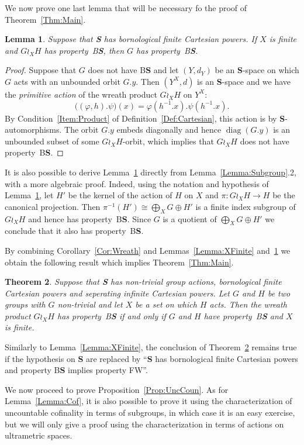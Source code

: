 \documentclass[a4paper]{article}
\newtheorem{lem}{Lemma}[section]
\newtheorem{thm}[lem]{Theorem}
\theoremstyle{definition}
\DeclareMathOperator\diag{diag}
\newcommand*{\category}[1]{\textbf{#1}}
\newcommand*{\CatS}{\category{S}}
\newcommand*{\BS}{B\textbf{S}}
\newcommand*{\FW}{FW}
\begin{document}
%
%
We now prove one last lemma that will be necessary fo the proof of Theorem~\ref{Thm:Main}.
%
%
\begin{lem}\label{Lemma:Unboundedness}
Suppose that \CatS{} has bornological finite Cartesian powers. If $X$ is finite and $G\wr_XH$ has property~\BS, then $G$ has property~\BS.
\end{lem}
\begin{proof}
Suppose that $G$ does not have \BS{} and let $(Y,d_Y)$ be an \CatS-space on which $G$ acts with an unbounded orbit $G.y$.
Then $(Y^X,d)$ is an \CatS-space and we have the \emph{primitive action} of the wreath product $G\wr_XH$ on $Y^X$:
\[
	\bigl((\varphi,h).\psi\bigr)(x)=\varphi(h^{-1}.x).\psi(h^{-1}.x).
\]
By Condition~\ref{Item:Product} of Definition~\ref{Def:Cartesian}, this action is by \CatS-automorphisms.
The orbit $G.y$ embeds diagonally and hence $\diag(G.y)$ is an unbounded subset of some $G\wr_XH$-orbit, which implies that $G\wr_XH$ does not have property~\BS.
\end{proof}
%
%
It is also possible to derive Lemma~\ref{Lemma:Unboundedness} directly from Lemma~\ref{Lemma:Subgroup}.2, with a more algebraic proof.
Indeed, using the notation and hypothesis of Lemma~\ref{Lemma:Unboundedness}, let $H'$ be the kernel of the action of $H$ on $X$ and $\pi\colon G\wr_XH\to H$ be the canonical projection. Then $\pi^{-1}(H')\cong \bigoplus_XG\oplus H'$ is a finite index subgroup of $G\wr_XH$ and hence has property~\BS.
Since $G$ is a quotient of $\bigoplus_XG\oplus H'$ we conclude that it also has property~\BS.

By combining Corollary~\ref{Cor:Wreath} and Lemmas~\ref{Lemma:XFinite} and~\ref{Lemma:Unboundedness} we obtain the following result which implies Theorem~\ref{Thm:Main}.
%
%
\begin{thm}\label{Thm:Technic}
Suppose that \CatS{} has non-trivial group actions, bornological finite Cartesian powers and seperating infinite Cartesian powers.
Let $G$ and $H$ be two groups with $G$ non-trivial and let $X$ be a set on which $H$ acts. Then the wreath product $G \wr_X H$ has property~\BS{} if and only if $G$ and $H$ have property~\BS{} and $X$ is finite.
\end{thm}
%
%
Similarly to Lemma~\ref{Lemma:XFinite}, the conclusion of Theorem~\ref{Thm:Technic} remains true if the hypothesis on \CatS{} are replaced  by ``\CatS{} has bornological finite Cartesian powers and property \BS{} implies property \FW''.

We now proceed to prove Proposition~\ref{Prop:UncCoun}.
As for Lemma~\ref{Lemma:Cof}, it is also possible to prove it using the characterization of uncountable cofinality in terms of subgroups, in which case it is an easy exercise, but we will only give a proof using the characterization in terms of actions on ultrametric spaces.
\end{document}
